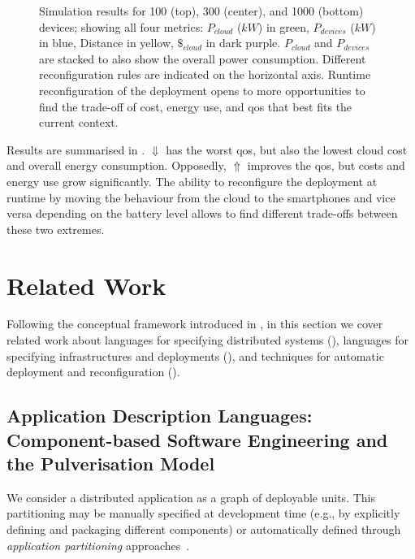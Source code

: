 \documentclass[conference]{IEEEtran}
\begin{document}
\begin{figure}
    \caption{
        Simulation results for 100 (top), 300 (center), and 1000 (bottom) devices;
        showing all four metrics:
        $P_{cloud}$ ($kW$) in green,
        $P_{devices}$ ($kW$) in blue,
        Distance in yellow, $\$_{cloud}$ in dark purple.
        $P_{cloud}$ and $P_{devices}$ are stacked to also show the overall power consumption.
        Different reconfiguration rules are indicated on the horizontal axis.
        Runtime reconfiguration of the deployment opens to more opportunities to find the trade-off of cost,
        energy use, and \ac{qos} that best fits the current context.
    }
    \label{fig:results}
\end{figure}
%
Results are summarised in .
%
$\Downarrow$ has the worst \ac{qos}, but also the lowest cloud cost and overall energy consumption.
%
Opposedly, $\Uparrow$ improves the \ac{qos}, but costs and energy use grow significantly.
%
The ability to reconfigure the deployment at runtime
by moving the behaviour from the cloud to the smartphones and vice versa
depending on the battery level allows to find different trade-offs between these two extremes.

\section{Related Work}
\label{sec:rw}

%
Following the conceptual framework introduced in ,
 in this section we cover related work about
 languages for 
 specifying distributed systems (),
 languages for specifying infrastructures and deployments (),
 and
 techniques for automatic deployment and reconfiguration ().
 
 
 
\subsection{Application Description Languages: Component-based Software Engineering and the Pulverisation Model}
\label{sec:rw:whatsw}
%
%
We consider a distributed application 
 as a graph of deployable units.
%
This partitioning may be 
 manually specified at development time
 (e.g., by explicitly defining and packaging different components)
 or automatically defined
 through \emph{application partitioning} approaches~\cite{DBLP:journals/jnca/LiuASGBQ15}. %
 
\end{document}
